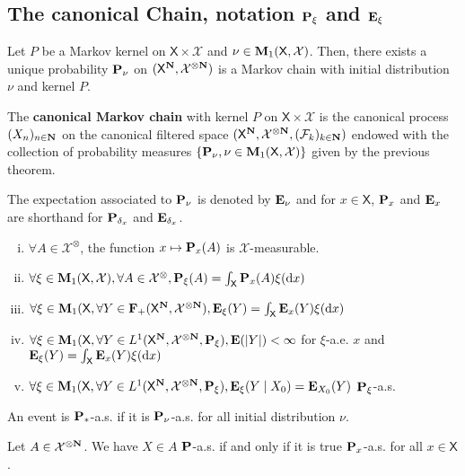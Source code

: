 \subsection{The canonical Chain, notation $\mathbf{P}_\xi$ and $\mathbf{E}_\xi$}

	\begin{thm}
		Let $P$ be a Markov kernel on $\mathsf{X} \times \mathcal{X}$ and $\nu \in \mathbf{M}_1(\mathsf{X}, \mathcal{X})$.
		Then, there exists a unique probability $\mathbf{P}_\nu$ on $(\mathsf{X}^{\mathbf{N}},\mathcal{X}^{\otimes \mathbf{N}})$ is a Markov chain with initial distribution $\nu$ and kernel $P$.
	\end{thm}

	\begin{defn}
		The \textbf{canonical Markov chain} with kernel $P$ on $\mathsf{X} \times \mathcal{X}$ is the canonical process $(X_n)_{n \in \mathbf{N}}$ on the canonical filtered space $(\mathsf{X}^{\mathbf{N}},\mathcal{X}^{\otimes \mathbf{N}},(\mathcal{F}_k)_{k \in \mathbf{N}})$ endowed with the collection of probability measures $\{ \mathbf{P}_\nu, \nu \in \mathbf{M}_1(\mathsf{X},\mathcal{X}) \}$ given by the previous theorem.
	\end{defn}

	The expectation associated to $\mathbf{P}_\nu$ is denoted by $\mathbf{E}_\nu$ and for $x \in \mathsf{X}$, $\mathbf{P}_x$ and $\mathbf{E}_x$ are shorthand for $\mathbf{P}_{\delta_x}$ and $\mathbf{E}_{\delta_x}$.
	
	\begin{pop}
		\begin{enumerate}[(i)]
			\item $\forall A \in \mathcal{X}^{\otimes}$, the function $x \mapsto \mathbf{P}_x(A)$ is $\mathcal{X}$-measurable.
			\item $\forall \xi \in \mathbf{M}_1(\mathsf{X},\mathcal{X}), \forall A \in \mathcal{X}^{\otimes}, \mathbf{P}_\xi(A) = \int_{\mathsf{X}} \mathbf{P}_x(A) \xi(\mathop{}\mathopen{}\mathrm{d} x)$
			\item $\forall \xi \in \mathbf{M}_1(\mathsf{X}, \forall Y \in \mathbf{F}_+(\mathsf{X}^{\mathbf{N}},\mathcal{X}^{\otimes \mathbf{N}}), \mathbf{E}_\xi(Y) = \int_{\mathsf{X}} \mathbf{E}_x(Y) \xi(\mathop{}\mathopen{}\mathrm{d} x)$
			\item $\forall \xi \in \mathbf{M}_1(\mathsf{X}, \forall Y \in L^1(\mathsf{X}^{\mathbf{N}},\mathcal{X}^{\otimes \mathbf{N}}, \mathbf{P}_\xi), \mathbf{E}(\left\lvert Y\right\rvert) < \infty$ for $\xi$-a.e. $x$ and $\mathbf{E}_\xi(Y) = \int_{\mathsf{X}} \mathbf{E}_x(Y) \xi(\mathop{}\mathopen{}\mathrm{d} x)$
			\item $\forall \xi \in \mathbf{M}_1(\mathsf{X}, \forall Y \in L^1(\mathsf{X}^{\mathbf{N}},\mathcal{X}^{\otimes \mathbf{N}}, \mathbf{P}_\xi), \mathbf{E}_\xi(Y \mid X_0) = \mathbf{E}_{X_0}(Y)$ $\mathbf{P}_\xi$-a.s.
		\end{enumerate}
	\end{pop}

	\begin{defn}
		An event is $\mathbf{P}_*$-a.s. if it is $\mathbf{P}_\nu$-a.s. for all initial distribution $\nu$.
	\end{defn}

	\begin{lem}
		Let $A \in \mathcal{X}^{\otimes \mathbf{N}}$.
		We have $X \in A$ $\mathbf{P}$-a.s. if and only if it is true $\mathbf{P}_x$-a.s. for all $x \in \mathsf{X}$.
	\end{lem}
